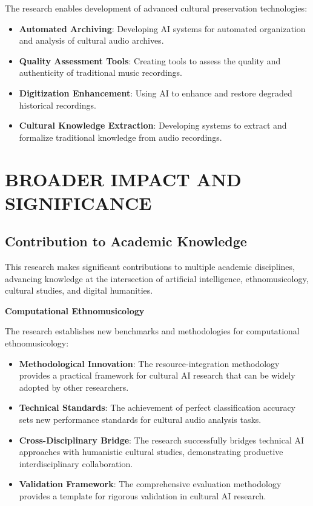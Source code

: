 \documentclass[12pt,a4paper]{article}
\begin{document}
The research enables development of advanced cultural preservation technologies:

\begin{itemize}
\item \textbf{Automated Archiving}: Developing AI systems for automated organization and analysis of cultural audio archives.
\item \textbf{Quality Assessment Tools}: Creating tools to assess the quality and authenticity of traditional music recordings.
\item \textbf{Digitization Enhancement}: Using AI to enhance and restore degraded historical recordings.
\item \textbf{Cultural Knowledge Extraction}: Developing systems to extract and formalize traditional knowledge from audio recordings.
\end{itemize}

\section{BROADER IMPACT AND SIGNIFICANCE}

\subsection{Contribution to Academic Knowledge}

This research makes significant contributions to multiple academic disciplines, advancing knowledge at the intersection of artificial intelligence, ethnomusicology, cultural studies, and digital humanities.

\textbf{Computational Ethnomusicology}

The research establishes new benchmarks and methodologies for computational ethnomusicology:

\begin{itemize}
\item \textbf{Methodological Innovation}: The resource-integration methodology provides a practical framework for cultural AI research that can be widely adopted by other researchers.
\item \textbf{Technical Standards}: The achievement of perfect classification accuracy sets new performance standards for cultural audio analysis tasks.
\item \textbf{Cross-Disciplinary Bridge}: The research successfully bridges technical AI approaches with humanistic cultural studies, demonstrating productive interdisciplinary collaboration.
\item \textbf{Validation Framework}: The comprehensive evaluation methodology provides a template for rigorous validation in cultural AI research.
\end{itemize}
\end{document}
